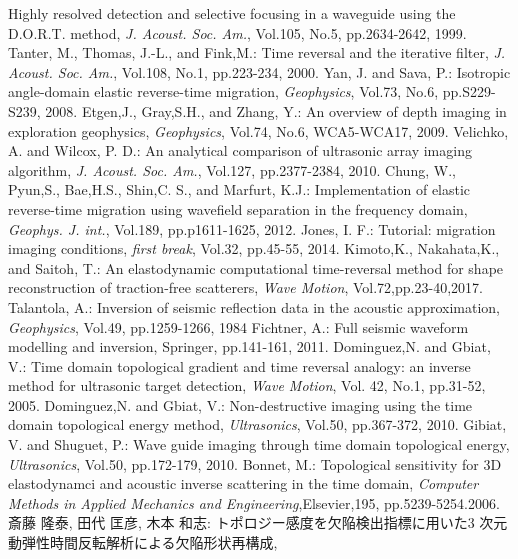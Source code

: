 \documentclass[jscefinal]{jjsce}%
\begin{document}
\begin{thebibliography}{9}
	Highly resolved detection and selective focusing in a waveguide using the D.O.R.T. method,
	\textit{ J. Acoust. Soc. Am.}, Vol.105, No.5, pp.2634-2642, 1999. 
	Tanter, M., Thomas, J.-L., and Fink,M.:
	Time reversal and the iterative filter, 
	\textit{ J. Acoust. Soc. Am.}, Vol.108, No.1, pp.223-234, 2000. 
	 Yan, J. and Sava, P.:
	Isotropic angle-domain elastic reverse-time migration,
	\textit{ Geophysics}, Vol.73, No.6, pp.S229-S239, 2008. 
	Etgen,J., Gray,S.H., and Zhang, Y.: 
	An overview of depth imaging in exploration geophysics,
	\textit{ Geophysics}, Vol.74, No.6, WCA5-WCA17, 2009.
	Velichko, A.  and Wilcox, P. D.:
	An analytical comparison of ultrasonic array imaging algorithm,
	\textit{ J. Acoust. Soc. Am.}, Vol.127, pp.2377-2384, 2010.
	Chung, W., Pyun,S., Bae,H.S., Shin,C. S., and Marfurt, K.J.:
	Implementation of elastic reverse-time migration using wavefield separation in the frequency domain,
	\textit{Geophys. J. int.}, Vol.189, pp.p1611-1625, 2012. 
	Jones, I. F.:
	Tutorial: migration imaging conditions, 
	\textit{first break}, Vol.32, pp.45-55, 2014.
	Kimoto,K.,  Nakahata,K., and Saitoh, T.: 
	An elastodynamic computational time-reversal method for shape reconstruction 
	of traction-free scatterers, \textit{Wave Motion}, Vol.72,pp.23-40,2017.
	Talantola, A.:
	Inversion of seismic reflection data in the acoustic approximation, 
	\textit{Geophysics}, Vol.49, pp.1259-1266, 1984
	Fichtner, A.: Full seismic waveform modelling and inversion,
	Springer, pp.141-161, 2011. 
	Dominguez,N. and Gbiat, V.:
	Time domain topological gradient and time reversal analogy: 
	an inverse method for ultrasonic target detection, 
	\textit{ Wave Motion}, Vol. 42, No.1, pp.31-52, 2005.
	Dominguez,N. and Gbiat, V.:
	Non-destructive imaging using the time domain topological energy method,
	\textit{ Ultrasonics}, Vol.50, pp.367-372, 2010.
	Gibiat, V. and Shuguet, P.:
	Wave guide imaging through time domain topological energy,
	\textit{ Ultrasonics}, Vol.50, pp.172-179, 2010.
	Bonnet, M.: 
	Topological sensitivity for 3D elastodynamci and acoustic inverse scattering in the time domain,
	\textit{Computer Methods in Applied Mechanics and Engineering},Elsevier,195, pp.5239-5254.2006.
	斎藤 隆泰, 田代 匡彦, 木本 和志: 
	トポロジー感度を欠陥検出指標に用いた3 次元動弾性時間反転解析による欠陥形状再構成, 

\end{thebibliography}
\end{document}
